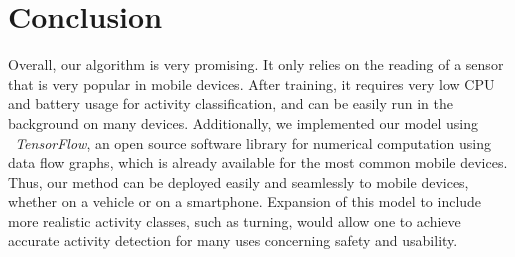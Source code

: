 \documentclass{article}
\begin{document}
\section{Conclusion}
\vspace{-.3cm}
Overall, our algorithm is very promising. It only relies on the reading of a sensor that is very 
popular in mobile devices. After training, it requires very low CPU and battery usage for 
activity classification, and can be easily run in the background on many devices. 
Additionally, we implemented our model using \textit{\ TensorFlow}, an open source software 
library for numerical computation using data flow graphs, which is already available for the most
common mobile devices. Thus, our method can be deployed easily and seamlessly to mobile 
devices, whether on a vehicle or on a smartphone. Expansion of this model to include more 
realistic activity classes, such as turning, would allow one to achieve accurate activity 
detection for many uses concerning safety and usability.


{\scriptsize%

}
\end{document}
